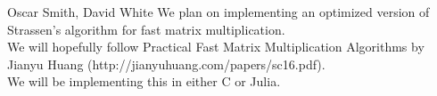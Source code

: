 \documentclass{article}
\begin{document}
Oscar Smith, David White
We plan on implementing an optimized version of Strassen’s algorithm for fast matrix multiplication.\\
We will hopefully follow Practical Fast Matrix Multiplication Algorithms by Jianyu Huang (http://jianyuhuang.com/papers/sc16.pdf).\\
We will be implementing this in either C or Julia.
\end{document}
